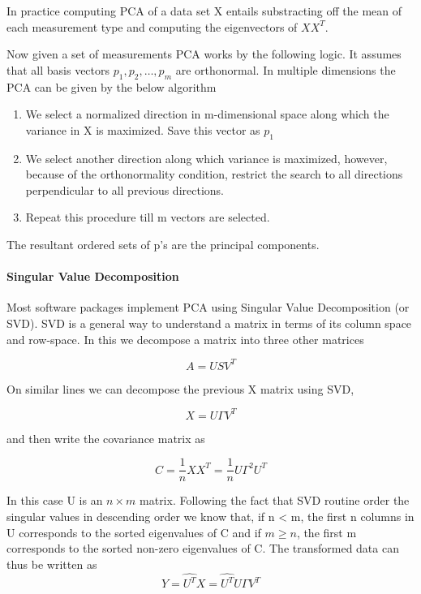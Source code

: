 \documentclass{book}
\begin{document}
In practice computing PCA of a data set X entails substracting off the mean of each measurement type and computing the eigenvectors of $XX^T$.

Now given a set of measurements PCA works by the following logic. It assumes that all basis vectors ${p_1, p_2, \ldots, p_m}$ are orthonormal. In multiple dimensions the PCA can be given by the below algorithm

 \begin{enumerate}
 	\item We select a normalized direction in m-dimensional space along which the variance in X is maximized. Save this vector as $p_1$
 	\item We select another direction along which variance is maximized, however, because of the orthonormality condition, restrict the search to all directions perpendicular to all previous directions. 
 	\item Repeat this procedure till m vectors are selected.
 \end{enumerate}

The resultant ordered sets of p's are the principal components.

\paragraph{Singular Value Decomposition}%
Most software packages implement PCA using Singular Value Decomposition (or SVD). SVD is a general way to understand a matrix in terms of its column space and row-space. In this we decompose a matrix into three other matrices

\begin{equation}
	A = USV^T
\end{equation}

On similar lines we can decompose the previous X matrix using SVD,

\begin{equation}
	X = U \Gamma V^T
\end{equation}

and then write the covariance matrix as

\begin{equation}
	C = \frac{1}{n}XX^T = \frac{1}{n}U\Gamma^2U^T
\end{equation}

In this case U is an $n \times m$ matrix. Following the fact that SVD routine order the singular values in descending order we know that, if n < m, the first n columns in U corresponds to the sorted eigenvalues of C and if $m \geq n$, the first m corresponds to the sorted non-zero eigenvalues of C. The transformed data can thus be written as
\begin{equation}
	Y = \hat{U^T}X = \hat{U^T}U \Gamma V^T
\end{equation}
\end{document}
